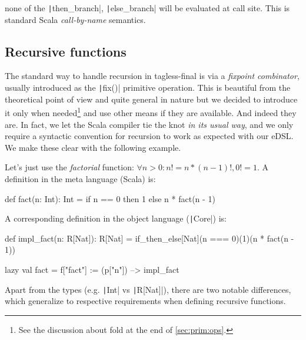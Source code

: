 \documentclass[11pt]{article}
\newcommand{\ScalaI}[1]{\texttt|#1|}
\begin{document}
\noindent none of the \ScalaI{then_branch}, \ScalaI{else_branch} will be evaluated at call site. This is standard Scala \textit{call-by-name} semantics.


\subsection{Recursive functions}
\label{sec:rec:fun}
The standard way to handle recursion in tagless-final is via a \textit{fixpoint combinator}, usually introduced as the \ScalaI{fix()} primitive operation. This is beautiful from the theoretical point of view and quite general in nature but we decided to introduce it only when needed\footnote{See the discussion about fold at the end of \autoref{sec:prim:ops}.} and use other means if they are available. And indeed they are. In fact, we let the Scala compiler tie the knot \textit{in its usual way}, and we only require a syntactic convention for recursion to work as expected with our eDSL. We make these clear with the following example.

Let's just use the \textit{factorial} function: $\forall n > 0: n! = n * (n - 1)!, 0! = 1$. A definition in the meta language (Scala) is:

\begin{ScalaBlockSimple}
def fact(n: Int): Int =
  if n == 0 then 1 else n * fact(n - 1)
\end{ScalaBlockSimple}

\noindent A corresponding definition in the object language (\ScalaI{Core}) is:

\begin{ScalaBlockSimple}
  def impl_fact(n: R[Nat]): R[Nat] =
    if_then_else[Nat](n === 0)(1)(n * fact(n - 1))

  lazy val fact = f["fact"] := (p["n"]) --> impl_fact
\end{ScalaBlockSimple}

\noindent Apart from the types (e.g. \ScalaI{Int} vs \ScalaI{R[Nat]}), there are two notable differences, which generalize to respective requirements when defining recursive functions.
\end{document}
